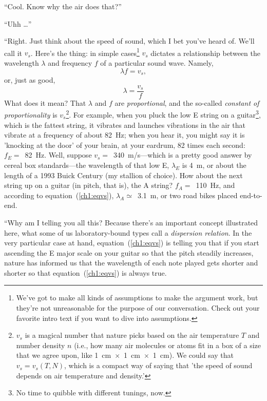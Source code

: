 \X ``Cool. Know why the air does that?''


\X ``Uhh \dots''


\X ``Right. Just think about the speed of sound, which I bet you've
heard of. We'll call it $v_s$. Here's the thing: in simple
cases\footnote{We've got to make all kinds of assumptions to make the
  argument work, but they're not unreasonable for the purpose of our
  conversation. Check out your favorite intro text if you want to dive
  into assumptions.} $v_s$ dictates a relationship between the
wavelength $\lambda$ and frequency $f$ of a particular sound wave. Namely,
\begin{equation}
  \label{ch1:eqvs}
  \lambda f = v_s,
\end{equation}
or, just as good,
\begin{equation}
  \label{ch1:eqvsdiff}
  \lambda = \frac{v_s}{f}
\end{equation}
What does it mean? That $\lambda$ and $f$ are \emph{proportional}, and
the so-called \emph{constant of proportionality} is
$v_s$\footnote{$v_s$ is a magical number that nature picks based on
  the air temperature $T$ and number density $n$ (i.e., how many air
  molecules or atoms fit in a box of a size that we agree upon, like
  1~cm~$\times$~1~cm~$\times$~1~cm). We could say that $v_s = v_s (T,
  N)$, which is a compact way of saying that 'the speed of sound
  depends on air temperature and density.'}. For example, when you
pluck the low E string on a guitar\footnote{No time to quibble with
  different tunings, now.}, which is the fattest string, it vibrates
and launches vibrations in the air that vibrate at a frequency of
about 82~Hz; when you hear it, you might say it is 'knocking at the
door' of your brain, at your eardrum, 82 times each second: $f_E =
$~82~Hz. Well, suppose $v_s =$~340~m/s---which is a pretty good answer
by cereal box standards---the wavelength of that low E, $\lambda_E$ is
4~m, or about the length of a 1993 Buick Century (my stallion of
choice). How about the next string up on a guitar (in pitch, that is),
the A string? $f_A = $~110~Hz, and according to
equation~(\ref{ch1:eqvs}), $\lambda_A \simeq$~3.1~m, or two road bikes
placed end-to-end.

\X ``Why am I telling you all this? Because there's an important
concept illustrated here, what some of us laboratory-bound types call
a \emph{dispersion relation}. In the very particular case at hand,
equation~(\ref{ch1:eqvs}) is telling you that if you start ascending
the E major scale on your guitar so that the pitch steadily increases,
nature has informed us that the wavelength of each note played gets
shorter and shorter so that equation~(\ref{ch1:eqvs}) is always true.


